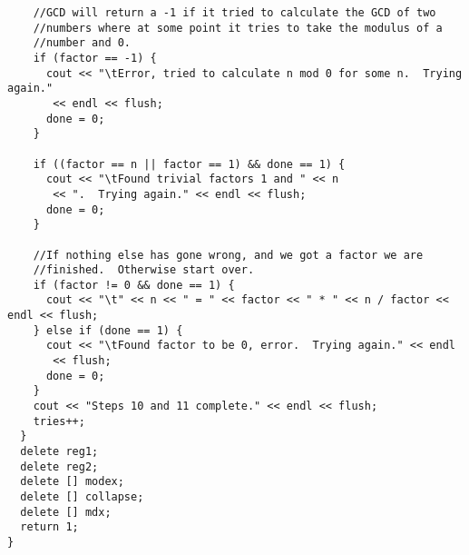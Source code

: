 \documentclass[]{article}
\begin{document}
\begin{verbatim}
    //GCD will return a -1 if it tried to calculate the GCD of two
    //numbers where at some point it tries to take the modulus of a
    //number and 0.
    if (factor == -1) {
      cout << "\tError, tried to calculate n mod 0 for some n.  Trying again."
	   << endl << flush;
      done = 0;
    }

    if ((factor == n || factor == 1) && done == 1) {
      cout << "\tFound trivial factors 1 and " << n 
	   << ".  Trying again." << endl << flush;
      done = 0;
    }
    
    //If nothing else has gone wrong, and we got a factor we are
    //finished.  Otherwise start over.
    if (factor != 0 && done == 1) {
      cout << "\t" << n << " = " << factor << " * " << n / factor << endl << flush;
    } else if (done == 1) {
      cout << "\tFound factor to be 0, error.  Trying again." << endl 
	   << flush;
      done = 0;
    }
    cout << "Steps 10 and 11 complete." << endl << flush;
    tries++;
  }
  delete reg1;
  delete reg2;
  delete [] modex;
  delete [] collapse;
  delete [] mdx;
  return 1;
}
\end{verbatim}
\end{document}
